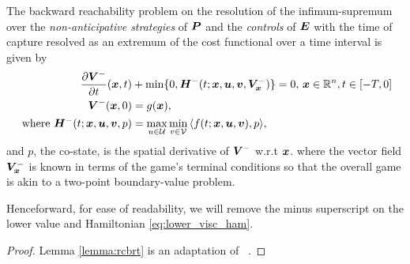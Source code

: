 \begin{lemma}
	The backward reachability problem on the resolution of the infimum-supremum over the \textit{non-anticipative strategies} of $\bm{P}$ and the \textit{controls} of $\bm{E}$ with the time of capture resolved as an extremum of the cost functional over a time interval is given by %
	\begin{subequations}
		\begin{align}
			\frac{\partial \bm{V}^-}{\partial t}{(\bm{x}, t)} & + \min \{0, \bm{H}^- (t; \bm{x}, \bm{u}, \bm{v},\bm{V}^-_{\bm{x}}) \} = 0, \, \bm{x} \in \mathbb{R}^n, t \in \left[-T, 0\right]\\
			\bm{V}^-(\bm{x},0) &= g(\bm{x}), \\
	\text{ where } 	\bm{H}^- (t; \bm{x}, \bm{u}, \bm{v}, p) &= \max_{u \in \mathcal{U}} \min_{v \in \mathcal{V}} \, \langle f(t; \bm{x}, \bm{u}, \bm{v}), p  \rangle,
		\label{eq:lower_visc_ham}
	\end{align}
	\label{eq:lower_hji_pde}
	\end{subequations}
	and $p$, the co-state, is the spatial derivative of $\bm{V}^-$ w.r.t $\bm{x}$.
	\noindent where the vector field $\bm{V}^-_{\bm{x}}$ is known in terms of the game's terminal conditions so that the overall game is akin to a two-point boundary-value problem.
	\label{lemma:rcbrt}
\end{lemma} 
%
\noindent Henceforward, for ease of readability, we will remove the minus superscript on the lower value and Hamiltonian \eqref{eq:lower_visc_ham}. 
%
\begin{proof}
	Lemma \ref{lemma:rcbrt} is an adaptation of ~\cite{Mitchell2005}.
\end{proof}

